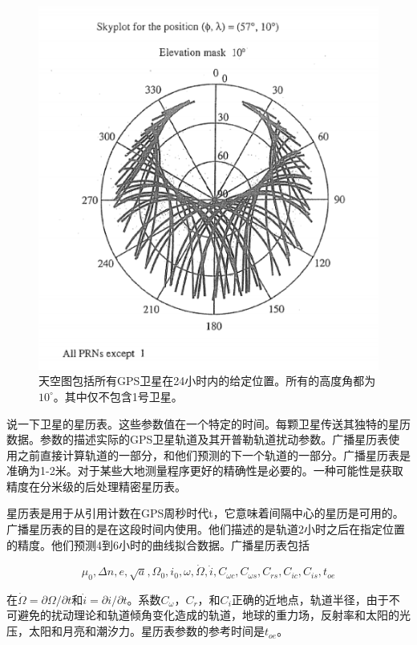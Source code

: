 	\begin{figure}
		\centering
		\includegraphics[width=0.7\linewidth]{TeX_files/Part03/chapter09/image/9-9}
		\caption{天空图包括所有GPS卫星在24小时内的给定位置。所有的高度角都为$10^\circ$。其中仅不包含1号卫星。}
		\label{fig:9-9}
	\end{figure}
	
	说一下卫星的星历表。这些参数值在一个特定的时间。每颗卫星传送其独特的星历数据。参数的描述实际的GPS卫星轨道及其开普勒轨道扰动参数。广播星历表使用之前直接计算轨道的一部分，和他们预测的下一个轨道的一部分。广播星历表是准确为1-2米。对于某些大地测量程序更好的精确性是必要的。一种可能性是获取精度在分米级的后处理精密星历表。
	
	星历表是用于从引用计数在GPS周秒时代t，它意味着间隔中心的星历是可用的。广播星历表的目的是在这段时间内使用。他们描述的是轨道2小时之后在指定位置的精度。他们预测4到6小时的曲线拟合数据。广播星历表包括
	
	$$\mu_0,\Delta n,e,\sqrt{a},\Omega_0,i_0,\omega,\dot{\Omega},\dot{i},C_{\omega c},C_{\omega s},C_{rs},C_{ic},C_{is},t_{oe}$$
	 
	在$\dot{\Omega}=\partial \Omega / \partial t$和$\dot{i}=\partial i / \partial t$。系数$C_\omega$，$C_r$，和$C_i$正确的近地点，轨道半径，由于不可避免的扰动理论和轨道倾角变化造成的轨道，地球的重力场，反射率和太阳的光压，太阳和月亮和潮汐力。星历表参数的参考时间是$t_{oe}$。
	
